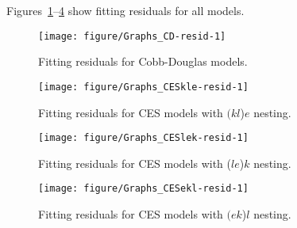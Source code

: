 \documentclass[preprint,authoryear,12pt]{elsarticle}\usepackage[]{graphicx}\usepackage[]{color}
\makeatletter
\def\maxwidth{ %
  \ifdim\Gin@nat@width>\linewidth
    \linewidth
  \else
    \Gin@nat@width
  \fi
}
\newenvironment{knitrout}{}{} %
\makeatother
\begin{document}
Figures~\ref{fig:Graphs CD-resid}--\ref{fig:Graphs CESekl-resid}
show fitting residuals for all models.
%
\begin{knitrout}
\color{fgcolor}\begin{figure}[H]

{\centering \texttt{[image: figure/Graphs\_CD-resid-1]} 

}

\caption[Fitting residuals for Cobb-Douglas models]{Fitting residuals for Cobb-Douglas models.}\label{fig:Graphs CD-resid}
\end{figure}


\end{knitrout}
%
\begin{knitrout}
\color{fgcolor}\begin{figure}[H]

{\centering \texttt{[image: figure/Graphs\_CESkle-resid-1]} 

}

\caption[Fitting residuals for CES models with ]{Fitting residuals for CES models with $(kl$)$e$ nesting.}\label{fig:Graphs CESkle-resid}
\end{figure}


\end{knitrout}
%
\begin{knitrout}
\color{fgcolor}\begin{figure}[H]

{\centering \texttt{[image: figure/Graphs\_CESlek-resid-1]} 

}

\caption[Fitting residuals for CES models with (]{Fitting residuals for CES models with ($le$)$k$ nesting.}\label{fig:Graphs CESlek-resid}
\end{figure}


\end{knitrout}
%
\begin{knitrout}
\color{fgcolor}\begin{figure}[H]

{\centering \texttt{[image: figure/Graphs\_CESekl-resid-1]} 

}

\caption[Fitting residuals for CES models with ]{Fitting residuals for CES models with $(ek$)$l$ nesting.}\label{fig:Graphs CESekl-resid}
\end{figure}


\end{knitrout}
\end{document}
